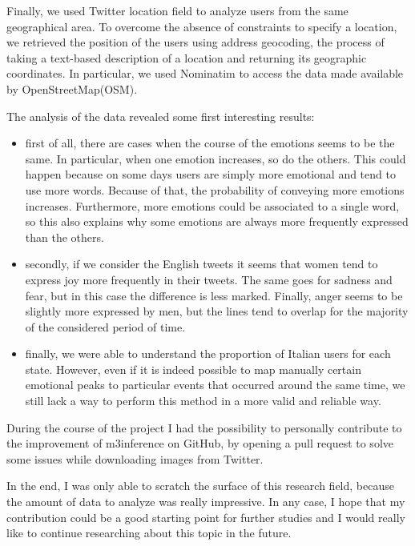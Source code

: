 Finally, we used Twitter location field to analyze users from the same geographical area. To overcome the absence of constraints to specify a location, we retrieved the position of the users using address geocoding, the process of taking a text-based description of a location and returning its geographic coordinates. In particular, we used Nominatim to access the data made available by OpenStreetMap(OSM).

The analysis of the data revealed some first interesting results:

\begin{itemize}
	\item first of all, there are cases when the course of the emotions seems to be the same. In particular, when one emotion increases, so do the others. This could happen because on some days users are simply more emotional and tend to use more words. Because of that, the probability of conveying more emotions increases. Furthermore, more emotions could be associated to a single word, so this also explains why some emotions are always more frequently expressed than the others.
	\item secondly, if we consider the English tweets it seems that women tend to express joy more frequently in their tweets. The same goes for sadness and fear, but in this case the difference is less marked. Finally, anger seems to be slightly more expressed by men, but the lines tend to overlap for the majority of the considered period of time.
	\item finally, we were able to understand the proportion of Italian users for each state. However, even if it is indeed possible to map manually certain emotional peaks to particular events that occurred around the same time, we still lack a way to perform this method in a more valid and reliable way.
\end{itemize}

During the course of the project I had the possibility to personally contribute to the improvement of m3inference on GitHub, by opening a pull request to solve some issues while downloading images from Twitter.

In the end, I was only able to scratch the surface of this research field, because the amount of data to analyze was really impressive. In any case, I hope that my contribution could be a good starting point for further studies and I would really like to continue researching about this topic in the future.
